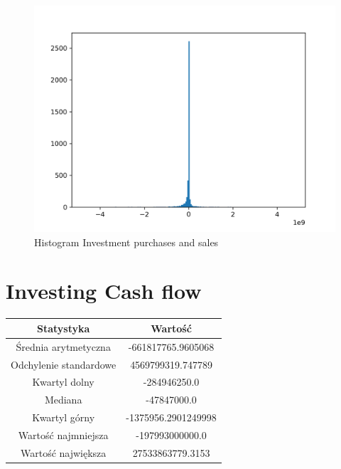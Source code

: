 \documentclass{article}
\begin{document}
\begin{figure}[h!]
    \includegraphics[width=\linewidth]{variables/Investment purchases and sales.png}
    \caption{Histogram Investment purchases and sales }
\end{figure}\section{ Investing Cash flow }

\begin{center}
    \begin{tabular}{|c | c|} 
    \hline
    Statystyka & Wartość \\
    \hline\hline
    Średnia arytmetyczna & -661817765.9605068 \\ 
    \hline
    Odchylenie standardowe & 4569799319.747789 \\
    \hline
    Kwartyl dolny & -284946250.0 \\
    \hline
    Mediana & -47847000.0 \\
    \hline
    Kwartyl górny & -1375956.2901249998 \\
    \hline
    Wartość najmniejsza & -197993000000.0 \\
    \hline
    Wartość największa & 27533863779.3153 \\
    \hline
   \end{tabular}
\end{center}
\end{document}
